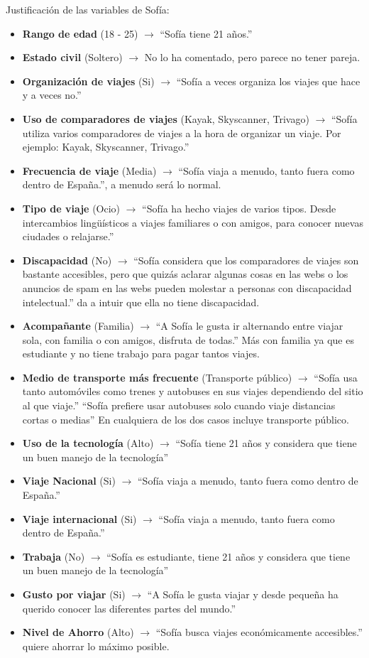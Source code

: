 \noindent Justificación de las variables de Sofía:
\begin{itemize}
    \item \textbf{Rango de edad} (18 - 25) $\rightarrow$ “Sofía tiene 21 años.”
    \item \textbf{Estado civil} (Soltero) $\rightarrow$ No lo ha comentado, pero parece no tener pareja. 
    \item \textbf{Organización de viajes} (Si) $\rightarrow$ “Sofía a veces organiza los viajes que hace y a veces no.”
    \item \textbf{Uso de comparadores de viajes} (Kayak, Skyscanner, Trivago) $\rightarrow$ “Sofía utiliza varios comparadores de viajes a la hora de organizar un viaje. Por ejemplo: Kayak, Skyscanner, Trivago.”
    \item \textbf{Frecuencia de viaje} (Media) $\rightarrow$ “Sofía viaja a menudo, tanto fuera como dentro de España.”, a menudo será lo normal.
    \item \textbf{Tipo de viaje} (Ocio) $\rightarrow$ “Sofía ha hecho viajes de varios tipos. Desde intercambios lingüísticos a viajes familiares o con amigos, para conocer nuevas ciudades o relajarse.”
    \item \textbf{Discapacidad} (No) $\rightarrow$ “Sofía considera que los comparadores de viajes son bastante accesibles, pero que quizás aclarar algunas cosas en las webs o los anuncios de spam en las webs pueden molestar a personas con discapacidad intelectual.” da a intuir que ella no tiene discapacidad.
    \item \textbf{Acompañante} (Familia) $\rightarrow$ “A Sofía le gusta ir alternando entre viajar sola, con familia o con amigos, disfruta de todas.” Más con familia ya que es estudiante y no tiene trabajo para pagar tantos viajes.
    \item \textbf{Medio de transporte más frecuente} (Transporte público) $\rightarrow$ “Sofía usa tanto automóviles como trenes y autobuses en sus viajes dependiendo del sitio al que viaje.” “Sofía prefiere usar autobuses solo cuando viaje distancias cortas o medias” En cualquiera de los dos casos incluye transporte público.
    \item \textbf{Uso de la tecnología} (Alto) $\rightarrow$ “Sofía tiene 21 años y considera que tiene un buen manejo de la tecnología”
    \item \textbf{Viaje Nacional} (Si) $\rightarrow$ “Sofía viaja a menudo, tanto fuera como dentro de España.”
    \item \textbf{Viaje internacional} (Si) $\rightarrow$ “Sofía viaja a menudo, tanto fuera como dentro de España.”
    \item \textbf{Trabaja} (No) $\rightarrow$ “Sofía es estudiante, tiene 21 años y considera que tiene un buen manejo de la tecnología” 
    \item \textbf{Gusto por viajar} (Si) $\rightarrow$ “A Sofía le gusta viajar y desde pequeña ha querido conocer las diferentes partes del mundo.”
    \item \textbf{Nivel de Ahorro} (Alto) $\rightarrow$ “Sofía busca viajes económicamente accesibles.” quiere ahorrar lo máximo posible.
\end{itemize}

